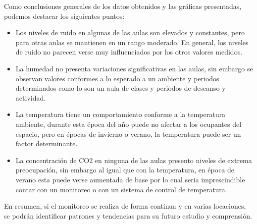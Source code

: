 \documentclass{templateNote}
\begin{document}
Como conclusiones generales de los datos obtenidos y las gráficas presentadas, podemos destacar los siguientes puntos:

\begin{itemize}
    \item Los niveles de ruido en algunas de las aulas son elevados y constantes, pero para otras aulas se mantienen en un rango moderado. En general, los niveles de ruido no parecen verse muy influenciados por los otros valores medidos.
    \item La humedad no presenta variaciones significativas en las aulas, sin embargo se observan valores conformes a lo esperado a un ambiente y periodos determinados como lo son un aula de clases y periodos de descanso y actividad.
    \item La temperatura tiene un comportamiento conforme a la temperatura ambiente, durante esta época del año puede no afectar a los ocupantes del espacio, pero en épocas de invierno o verano, la temperatura puede ser un factor determinante.
    \item La concentración de CO2 en ninguna de las aulas presento niveles de extrema preocupación, sin embargo al igual que con la temperatura, en época de verano esta puede verse aumentada de base por lo cual seria imprescindible contar con un monitoreo o con un sistema de control de temperatura.
\end{itemize}

\noindent En resumen, si el monitoreo se realiza de forma continua y en varias locaciones, se podrán identificar patrones y tendencias para su futuro estudio y comprensión.
\end{document}
